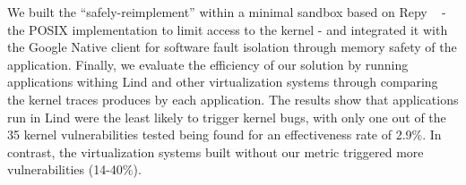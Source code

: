 We built the  ``safely-reimplement'' within a minimal sandbox based on Repy ~\cite{Repy-10} - the POSIX implementation 
to limit access to the kernel - and  integrated it with the Google Native client for software fault isolation through memory safety of the application. 
Finally, we evaluate the efficiency of our solution by running applications withing Lind and other virtualization systems 
through comparing the kernel traces produces by each application. 
The results show that applications run in Lind were the least likely to trigger kernel bugs, 
with only one out of the 35 kernel vulnerabilities tested being found for an effectiveness rate of 2.9\%. 
In contrast, the virtualization systems built without our metric triggered more vulnerabilities (14-40\%).  


